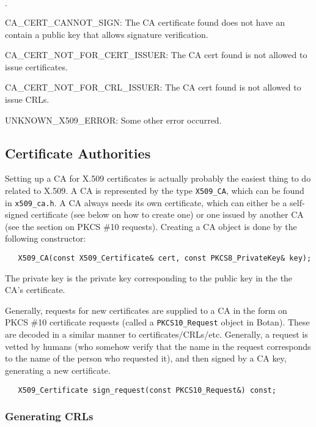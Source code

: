 \documentclass{article}
\newcommand{\filename}[1]{\texttt{#1}}
\newcommand{\type}[1]{\texttt{#1}}
\begin{document}
\begin{list}{$\cdot$}
   \item CA\_CERT\_CANNOT\_SIGN: The CA certificate found does not have an
         contain a public key that allows signature verification.
   \item CA\_CERT\_NOT\_FOR\_CERT\_ISSUER: The CA cert found is not allowed to
         issue certificates.
   \item CA\_CERT\_NOT\_FOR\_CRL\_ISSUER: The CA cert found is not allowed to
         issue CRLs.

  \item UNKNOWN\_X509\_ERROR: Some other error occurred.

\end{list}

\subsection{Certificate Authorities}

Setting up a CA for X.509 certificates is actually probably the easiest thing
to do related to X.509. A CA is represented by the type \type{X509\_CA}, which
can be found in \filename{x509\_ca.h}. A CA always needs its own certificate,
which can either be a self-signed certificate (see below on how to create one)
or one issued by another CA (see the section on PKCS \#10 requests). Creating
a CA object is done by the following constructor:

\begin{verbatim}
   X509_CA(const X509_Certificate& cert, const PKCS8_PrivateKey& key);
\end{verbatim}

The private key is the private key corresponding to the public key in the the
CA's certificate.

Generally, requests for new certificates are supplied to a CA in the form on
PKCS \#10 certificate requests (called a \type{PKCS10\_Request} object in
Botan). These are decoded in a similar manner to
certificates/CRLs/etc. Generally, a request is vetted by humans (who somehow
verify that the name in the request corresponds to the name of the person who
requested it), and then signed by a CA key, generating a new certificate.

\begin{verbatim}
   X509_Certificate sign_request(const PKCS10_Request&) const;
\end{verbatim}

\subsubsection{Generating CRLs}
\end{document}
